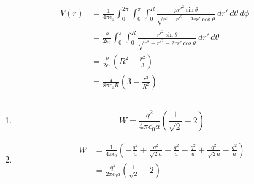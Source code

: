 \documentclass{article}
\newcommand{\ke}{\frac{1}{4 \pi \epsilon_0}}
\begin{document}
\setcounter{subsection}{27}
\subsection{}

\begin{align*}
  V(r) & = \ke \int_0^{2 \pi} \int_0^\pi \int_0^R \frac{\rho r'^2 \sin \theta}{\sqrt{r^2 + r'^2 - 2 r r' \cos \theta}} \,d r' \,d \theta \,d \phi \\
       & = \frac{\rho}{2 \epsilon_0} \int_0^\pi \int_0^R \frac{r'^2 \sin \theta}{\sqrt{r^2 + r'^2 - 2 r r' \cos \theta}} \,d r' \,d \theta        \\
       & = \frac{\rho}{2 \epsilon_0} \left( R^2 - \frac{r^2}{3} \right)                                                                           \\
       & = \frac{q}{8 \pi \epsilon_0 R} \left( 3 - \frac{r^2}{R^2} \right)
\end{align*}

\setcounter{subsection}{30}
\subsection{}

\begin{enumerate}
  \item \[W = \frac{q^2}{4 \pi \epsilon_0 a} \left( \frac{1}{\sqrt{2}} - 2 \right)\]

  \item

        \begin{align*}
          W & = \ke \left( -\frac{q^2}{a} + \frac{q^2}{\sqrt{2} a} - \frac{q^2}{a} - \frac{q^2}{a} + \frac{q^2}{\sqrt{2} a} - \frac{q^2}{a} \right) \\
            & = \frac{q^2}{2 \pi \epsilon_0 a} \left( \frac{1}{\sqrt{2}} - 2 \right)
        \end{align*}
\end{enumerate}

\subsection{}
\end{document}
